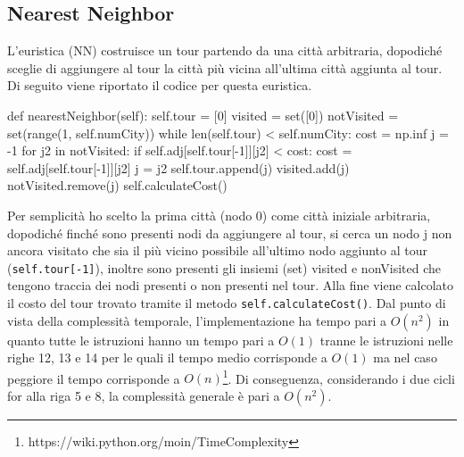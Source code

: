 \documentclass[a4paper,12pt]{report}
\begin{document}
\subsection{Nearest Neighbor}
L'euristica  (NN) costruisce un tour partendo da una città arbitraria, dopodiché sceglie di aggiungere al tour la città più vicina all'ultima città aggiunta al tour. Di seguito viene riportato il codice per questa euristica.
\begin{python}
def nearestNeighbor(self):
  self.tour = [0]
  visited = set([0])
  notVisited = set(range(1, self.numCity))
  while len(self.tour) < self.numCity:
    cost = np.inf
    j = -1
    for j2 in notVisited:
      if self.adj[self.tour[-1]][j2] < cost:
        cost = self.adj[self.tour[-1]][j2]
        j = j2
    self.tour.append(j)
    visited.add(j)
    notVisited.remove(j)
  self.calculateCost()
\end{python}
Per semplicità ho scelto la prima città (nodo 0) come città iniziale arbitraria, dopodiché finché sono presenti nodi da aggiungere al tour, si cerca un nodo j non ancora visitato che sia il più vicino possibile all'ultimo nodo aggiunto al tour (\lstinline!self.tour[-1]!), inoltre sono presenti gli insiemi (set) visited e nonVisited che tengono traccia dei nodi presenti o non presenti nel tour. Alla fine viene calcolato il costo del tour trovato tramite il metodo \lstinline!self.calculateCost()!. \newline
Dal punto di vista della complessità temporale, l'implementazione ha tempo pari a $O(n^2)$ in quanto tutte le istruzioni hanno un tempo pari a $O(1)$ tranne le istruzioni nelle righe 12, 13 e 14 per le quali il tempo medio corrisponde a $O(1)$ ma nel caso peggiore il tempo corrisponde a $O(n)$\footnote{https://wiki.python.org/moin/TimeComplexity}. Di conseguenza, considerando i due cicli for alla riga 5 e 8, la complessità generale è pari a $O(n^2)$.
\end{document}
